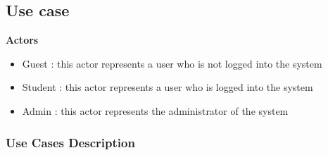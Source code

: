 \documentclass[a4paper, oneside]{article}
\begin{document}
\clearpage

\subsection{Use case}

\textbf{Actors}
\begin{itemize}
\item{Guest : this actor represents a user who is not logged into the system}
\item{Student : this actor represents a user who is logged into the system}
\item{Admin : this actor represents the administrator of the system}
\end{itemize}

\subsubsection{Use Cases Description}
\end{document}
